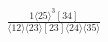 \documentclass[varwidth, border=5pt]{standalone}
\begin{document}
\begin{my}
$\begin{gathered}
\scriptscriptstyle\frac{1⟨25⟩^3[34]}{⟨12⟩⟨23⟩[23]⟨24⟩⟨35⟩}
\end{gathered}$
\end{my}
\end{document}
